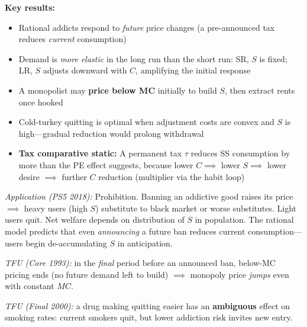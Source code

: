 \textbf{Key results:}
\begin{itemize}[nosep]
  \item Rational addicts respond to \textit{future} price changes (a pre-announced tax reduces \textit{current} consumption)
  \item Demand is \textit{more elastic} in the long run than the short run: SR, $S$ is fixed; LR, $S$ adjusts downward with $C$, amplifying the initial response
  \item A monopolist may \textbf{price below MC} initially to build $S$, then extract rents once hooked
  \item Cold-turkey quitting is optimal when adjustment costs are convex and $S$ is high---gradual reduction would prolong withdrawal
  \item \textbf{Tax comparative static:} A permanent tax $\tau$ reduces SS consumption by more than the PE effect suggests, because lower $C \implies$ lower $S \implies$ lower desire $\implies$ further $C$ reduction (multiplier via the habit loop)
\end{itemize}

\textit{Application (PS5 2018):} Prohibition. Banning an addictive good raises its price $\implies$ heavy users (high $S$) substitute to black market or worse substitutes. Light users quit. Net welfare depends on distribution of $S$ in population. The rational model predicts that even \textit{announcing} a future ban reduces current consumption---users begin de-accumulating $S$ in anticipation.

\textit{TFU (Core 1993):} in the \textit{final} period before an announced ban, below-MC pricing ends (no future demand left to build) $\implies$ monopoly price \textit{jumps} even with constant $MC$.

\textit{TFU (Final 2000):} a drug making quitting easier has an \textbf{ambiguous} effect on smoking rates: current smokers quit, but lower addiction risk invites new entry.
